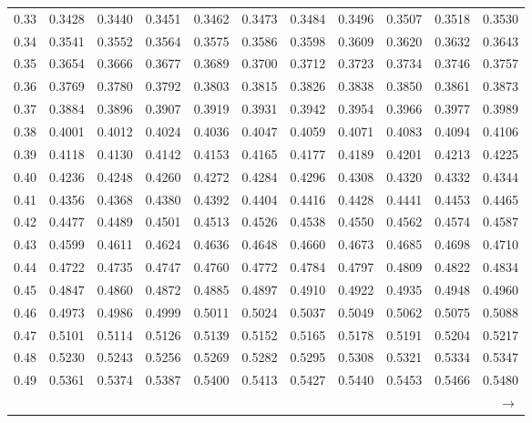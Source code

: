 \begin{center}
\begin{tabular}{r*{10}{r}}
		0.33 & 0.3428 & 0.3440 & 0.3451 & 0.3462 & 0.3473 & 0.3484 & 0.3496 & 0.3507 & 0.3518 & 0.3530 \\
		0.34 & 0.3541 & 0.3552 & 0.3564 & 0.3575 & 0.3586 & 0.3598 & 0.3609 & 0.3620 & 0.3632 & 0.3643 \\
		0.35 & 0.3654 & 0.3666 & 0.3677 & 0.3689 & 0.3700 & 0.3712 & 0.3723 & 0.3734 & 0.3746 & 0.3757 \\
		0.36 & 0.3769 & 0.3780 & 0.3792 & 0.3803 & 0.3815 & 0.3826 & 0.3838 & 0.3850 & 0.3861 & 0.3873 \\
		0.37 & 0.3884 & 0.3896 & 0.3907 & 0.3919 & 0.3931 & 0.3942 & 0.3954 & 0.3966 & 0.3977 & 0.3989 \\
		0.38 & 0.4001 & 0.4012 & 0.4024 & 0.4036 & 0.4047 & 0.4059 & 0.4071 & 0.4083 & 0.4094 & 0.4106 \\
		0.39 & 0.4118 & 0.4130 & 0.4142 & 0.4153 & 0.4165 & 0.4177 & 0.4189 & 0.4201 & 0.4213 & 0.4225 \\[5pt]
		0.40 & 0.4236 & 0.4248 & 0.4260 & 0.4272 & 0.4284 & 0.4296 & 0.4308 & 0.4320 & 0.4332 & 0.4344 \\
		0.41 & 0.4356 & 0.4368 & 0.4380 & 0.4392 & 0.4404 & 0.4416 & 0.4428 & 0.4441 & 0.4453 & 0.4465 \\
		0.42 & 0.4477 & 0.4489 & 0.4501 & 0.4513 & 0.4526 & 0.4538 & 0.4550 & 0.4562 & 0.4574 & 0.4587 \\
		0.43 & 0.4599 & 0.4611 & 0.4624 & 0.4636 & 0.4648 & 0.4660 & 0.4673 & 0.4685 & 0.4698 & 0.4710 \\
		0.44 & 0.4722 & 0.4735 & 0.4747 & 0.4760 & 0.4772 & 0.4784 & 0.4797 & 0.4809 & 0.4822 & 0.4834 \\
		0.45 & 0.4847 & 0.4860 & 0.4872 & 0.4885 & 0.4897 & 0.4910 & 0.4922 & 0.4935 & 0.4948 & 0.4960 \\0.46 & 0.4973 & 0.4986 & 0.4999 & 0.5011 & 0.5024 & 0.5037 & 0.5049 & 0.5062 & 0.5075 & 0.5088 \\
		0.47 & 0.5101 & 0.5114 & 0.5126 & 0.5139 & 0.5152 & 0.5165 & 0.5178 & 0.5191 & 0.5204 & 0.5217 \\
		0.48 & 0.5230 & 0.5243 & 0.5256 & 0.5269 & 0.5282 & 0.5295 & 0.5308 & 0.5321 & 0.5334 & 0.5347 \\
		0.49 & 0.5361 & 0.5374 & 0.5387 & 0.5400 & 0.5413 & 0.5427 & 0.5440 & 0.5453 & 0.5466 & 0.5480 \\
		&  &  &  &  &  &  &  &  &  & $\rightarrow$ \\
	\end{tabular}
\end{center}

